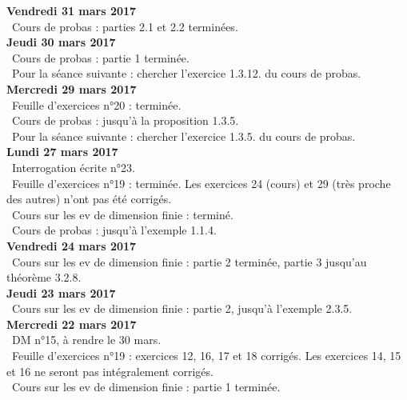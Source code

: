 \documentclass[12pt,a4paper]{article}
\begin{document}
\noindent\textbf{Vendredi 31 mars 2017}\\
\bu\ Cours de probas : parties 2.1 et 2.2 terminées.\vspace{.4cm}\\

\noindent\textbf{Jeudi 30 mars 2017}\\
\bu\ Cours de probas : partie 1 terminée.\\
\bu\ Pour la séance suivante : chercher l'exercice 1.3.12. du cours de probas.\vspace{.4cm}\\

\noindent\textbf{Mercredi 29 mars 2017}\\
\bu\ Feuille d'exercices n°20 : terminée.\\
\bu\ Cours de probas : jusqu'à la proposition 1.3.5.\\
\bu\ Pour la séance suivante : chercher l'exercice 1.3.5. du cours de probas.\vspace{.4cm}\\

\noindent\textbf{Lundi 27 mars 2017}\\
\bu\ Interrogation écrite n°23.\\
\bu\ Feuille d'exercices n°19 : terminée. Les exercices 24 (cours) et 29 (très proche des autres) n'ont pas été corrigés.\\
\bu\ Cours sur les ev de dimension finie : terminé.\\
\bu\ Cours de probas : jusqu'à l'exemple 1.1.4.\vspace{.4cm}\\

\noindent\textbf{Vendredi 24 mars 2017}\\
\bu\ Cours sur les ev de dimension finie : partie 2 terminée, partie 3 jusqu'au théorème 3.2.8.\vspace{.4cm}\\

\noindent\textbf{Jeudi 23 mars 2017}\\
\bu\ Cours sur les ev de dimension finie : partie 2, jusqu'à l'exemple 2.3.5.\vspace{.4cm}\\

\noindent\textbf{Mercredi 22 mars 2017}\\
\bu\ DM n°15, à rendre le 30 mars.\\
\bu\ Feuille d'exercices n°19 : exercices 12, 16, 17 et 18 corrigés. Les exercices 14, 15 et 16 ne seront pas intégralement corrigés. \\
\bu\ Cours sur les ev de dimension finie : partie 1 terminée.\vspace{.4cm}\\
\end{document}

